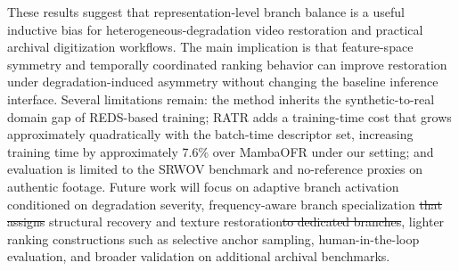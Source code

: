 \documentclass[symmetry,article,submit,pdftex,moreauthors]{Definitions/mdpi}
\providecommand{\DIFadd}[1]{{\protect\color{blue}\uwave{#1}}} %
\providecommand{\DIFdel}[1]{{\protect\color{red}\sout{#1}}}                      %
\providecommand{\DIFaddbegin}{} %
\providecommand{\DIFaddend}{} %
\providecommand{\DIFdelbegin}{} %
\providecommand{\DIFdelend}{} %
\begin{document}
These results suggest that representation-level branch balance is a useful inductive bias for heterogeneous-degradation video restoration and practical archival digitization workflows. The main implication is that feature-space symmetry and temporally coordinated ranking behavior can improve restoration under degradation-induced asymmetry without changing the baseline inference interface. Several limitations remain: the method inherits the synthetic-to-real domain gap of REDS-based training; RATR adds a training-time cost that grows approximately quadratically with the batch-time descriptor set, increasing training time by approximately 7.6\% over MambaOFR under our setting; and evaluation is limited to the SRWOV benchmark and no-reference proxies on authentic footage. Future work will focus on adaptive branch activation conditioned on degradation severity, frequency-aware branch specialization \DIFdelbegin \DIFdel{that assigns }\DIFdelend \DIFaddbegin \DIFadd{for }\DIFaddend structural recovery and texture restoration\DIFdelbegin \DIFdel{to dedicated branches}\DIFdelend , lighter ranking constructions such as selective anchor sampling, human-in-the-loop evaluation, and broader validation on additional archival benchmarks.

\vspace{6pt}





\end{document}
